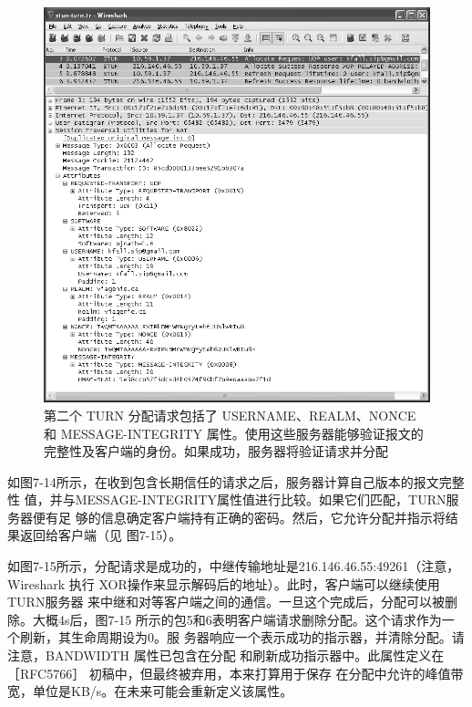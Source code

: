 \begin{figure}[H]
    \centering
	\includegraphics[scale=0.5]{imgs/7/7-14.png}
	\caption{第二个 TURN 分配请求包括了 USERNAME、REALM、NONCE 和 MESSAGE-INTEGRITY 属性。使用这些服务器能够验证报文的完整性及客户端的身份。如果成功，服务器将验证请求并分配}
\end{figure}

如图7-14所示，在收到包含长期信任的请求之后，服务器计算自己版本的报文完整性
值，并与MESSAGE-INTEGRITY属性值进行比较。如果它们匹配，TURN服务器便有足
够的信息确定客户端持有正确的密码。然后，它允许分配并指示将结果返回给客户端（见
图7-15）。

如图7-15所示，分配请求是成功的，中继传输地址是216.146.46.55:49261（注意，
Wireshark 执行 XOR操作来显示解码后的地址）。此时，客户端可以继续使用TURN服务器
来中继和对等客户端之间的通信。一旦这个完成后，分配可以被删除。大概4s后，图7-15
所示的包5和6表明客户端请求删除分配。这个请求作为一个刷新，其生命周期设为0。服
务器响应一个表示成功的指示器，并清除分配。请注意，BANDWIDTH 属性已包含在分配
和刷新成功指示器中。此属性定义在［RFC5766］ 初稿中，但最终被弃用，本来打算用于保存
在分配中允许的峰值带宽，单位是KB/s。在未来可能会重新定义该属性。


